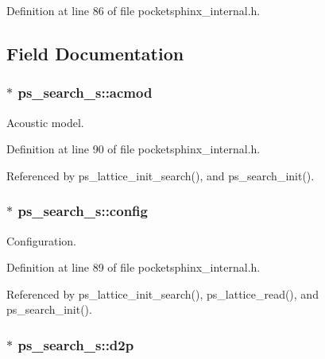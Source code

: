 \-Definition at line 86 of file pocketsphinx\-\_\-internal.\-h.



\subsection{\-Field \-Documentation}
\subsubsection[{acmod}]{$\ast$ {\bf ps\-\_\-search\-\_\-s\-::acmod}}\label{structps__search__s_a0fdf6fe8c4d9c28f10c48c09517c6b91}


\-Acoustic model. 



\-Definition at line 90 of file pocketsphinx\-\_\-internal.\-h.



\-Referenced by ps\-\_\-lattice\-\_\-init\-\_\-search(), and ps\-\_\-search\-\_\-init().

\subsubsection[{config}]{$\ast$ {\bf ps\-\_\-search\-\_\-s\-::config}}\label{structps__search__s_aa6e3e18165bbc70084a06575d5703042}


\-Configuration. 



\-Definition at line 89 of file pocketsphinx\-\_\-internal.\-h.



\-Referenced by ps\-\_\-lattice\-\_\-init\-\_\-search(), ps\-\_\-lattice\-\_\-read(), and ps\-\_\-search\-\_\-init().

\subsubsection[{d2p}]{$\ast$ {\bf ps\-\_\-search\-\_\-s\-::d2p}}\label{structps__search__s_a81b461e7ef3a080d046039e186134a15}


